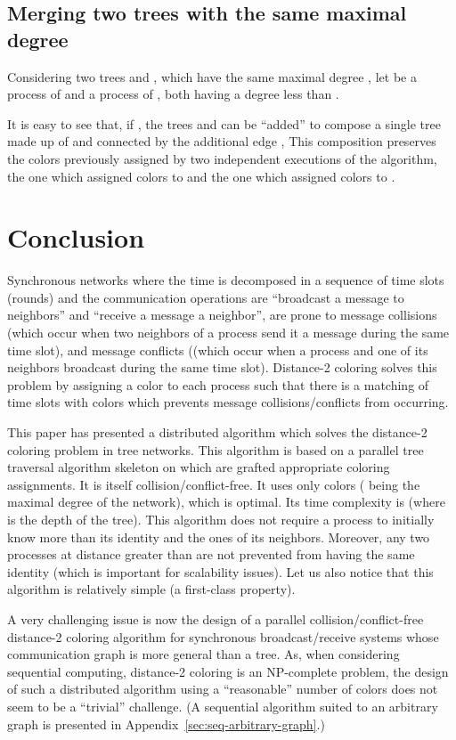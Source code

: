 \documentclass[11pt,english]{article}
\begin{document}
\subsection{Merging two trees with the same maximal degree}
Considering two trees  and , which have the same maximal 
degree , let    be a process of  and  
 a process of ,  both having a degree less than . 

It is easy to see that, if , the trees  and  can be ``added'' to  
compose a single tree made  up of  and  connected by the
additional edge , This composition preserves the colors
previously assigned by two  independent executions of the algorithm, the 
one which assigned colors to  and the one which assigned colors to .



\section{Conclusion}
\label{sec:conclusion}
Synchronous networks where the time is decomposed in a sequence of
time slots (rounds) and the communication operations are ``broadcast a
message to neighbors'' and ``receive a message a neighbor'', are prone
to message collisions (which occur when two neighbors of a process
send it a message during the same time slot), and message conflicts
((which occur when a process and one of its neighbors broadcast during
the same time slot).  Distance-2 coloring solves this problem by
assigning a color to each process such that there is a matching of
time slots with colors which prevents message collisions/conflicts
from occurring.

This paper has presented a distributed algorithm which solves the
distance-2 coloring problem in tree networks.  This algorithm is based
on a parallel tree traversal algorithm skeleton on which are grafted
appropriate coloring assignments.  It is itself
collision/conflict-free. It uses only  colors (
being the maximal degree of the network), which is optimal. Its time
complexity is  (where  is the depth of the tree). This
algorithm does not require a process to initially know more than its
identity and the ones of its neighbors. Moreover, any two processes at
distance greater than  are not prevented from having the same
identity (which is important for scalability issues).  Let us also
notice that this algorithm is  relatively simple (a first-class property).


A very challenging issue is now the design of a parallel 
collision/conflict-free distance-2 coloring algorithm for synchronous
broadcast/receive systems whose communication graph is more general
than a tree. As, when considering sequential computing, 
distance-2 coloring is an NP-complete problem, the design of such a
distributed algorithm using a ``reasonable'' number of colors does not seem
to be a  ``trivial''  challenge. (A sequential algorithm suited to an 
arbitrary graph is presented in Appendix~\ref{sec:seq-arbitrary-graph}.) 
\end{document}
